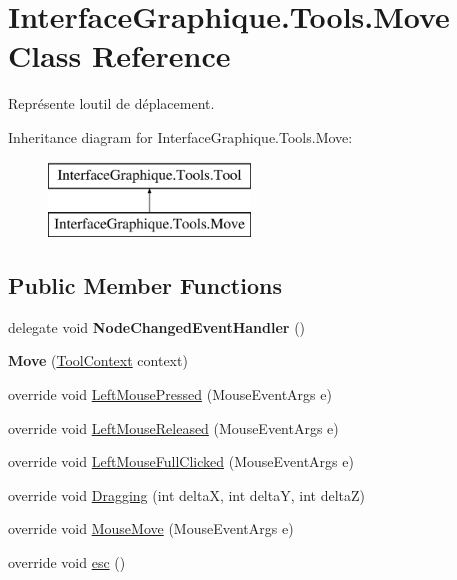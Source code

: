 \hypertarget{class_interface_graphique_1_1_tools_1_1_move}{}\section{Interface\+Graphique.\+Tools.\+Move Class Reference}
\label{class_interface_graphique_1_1_tools_1_1_move}


Représente l\textquotesingle{}outil de déplacement.  


Inheritance diagram for Interface\+Graphique.\+Tools.\+Move\+:\begin{figure}[H]
\begin{center}
\leavevmode
\includegraphics[height=2.000000cm]{class_interface_graphique_1_1_tools_1_1_move}
\end{center}
\end{figure}
\subsection*{Public Member Functions}
\begin{DoxyCompactItemize}
\item 
\hypertarget{class_interface_graphique_1_1_tools_1_1_move_aa447ff931a7cb490a7b44de3a7589292}{}delegate void {\bfseries Node\+Changed\+Event\+Handler} ()\label{class_interface_graphique_1_1_tools_1_1_move_aa447ff931a7cb490a7b44de3a7589292}

\item 
\hypertarget{class_interface_graphique_1_1_tools_1_1_move_a3874341a9c03a104287546f92b72cea9}{}{\bfseries Move} (\hyperlink{class_interface_graphique_1_1_tools_1_1_tool_context}{Tool\+Context} context)\label{class_interface_graphique_1_1_tools_1_1_move_a3874341a9c03a104287546f92b72cea9}

\item 
override void \hyperlink{class_interface_graphique_1_1_tools_1_1_move_a9bb3775998416ea36c2ca7009f37a6d9}{Left\+Mouse\+Pressed} (Mouse\+Event\+Args e)
\item 
override void \hyperlink{class_interface_graphique_1_1_tools_1_1_move_abff4c343d842c5513749a8c1f4c35338}{Left\+Mouse\+Released} (Mouse\+Event\+Args e)
\item 
override void \hyperlink{class_interface_graphique_1_1_tools_1_1_move_ab3c7919f138fa833fdf999adba7c8fdb}{Left\+Mouse\+Full\+Clicked} (Mouse\+Event\+Args e)
\item 
override void \hyperlink{class_interface_graphique_1_1_tools_1_1_move_ab6ce1689b59b7b60c55838ff344c8d7c}{Dragging} (int delta\+X, int delta\+Y, int delta\+Z)
\item 
override void \hyperlink{class_interface_graphique_1_1_tools_1_1_move_ab9f7749ef77fb21f385a9bc5b43bf234}{Mouse\+Move} (Mouse\+Event\+Args e)
\item 
override void \hyperlink{class_interface_graphique_1_1_tools_1_1_move_a72e41dcdef93cd060e499bd1f8683512}{esc} ()
\end{DoxyCompactItemize}
